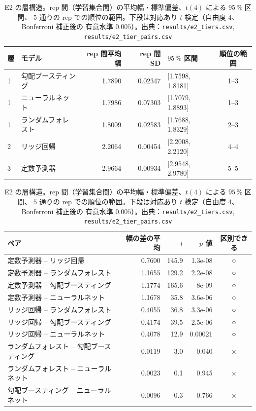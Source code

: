 \documentclass[a4paper,11pt]{jsarticle}
\theoremstyle{definition}
\theoremstyle{plain}
\theoremstyle{remark}
\begin{document}
\begin{table}[htbp]
  \centering
  \caption{E2 の層構造。rep 間（学習集合間）の平均幅・標準偏差、$t(4)$ による $95\,\%$ 区間、
    $5$ 通りの rep での順位の範囲。下段は対応あり $t$ 検定（自由度 $4$、Bonferroni 補正後の
    有意水準 $0.005$）。出典：\texttt{results/e2\_tiers.csv}, \texttt{results/e2\_tier\_pairs.csv}}
  \label{tab:e2-tiers}
  \small
  \begin{tabular}{llrrlc}
    \toprule
    層 & モデル & rep 間平均幅 & rep 間 SD & $95\,\%$ 区間 & 順位の範囲 \\
    \midrule
    1 & 勾配ブースティング & 1.7890 & 0.02347 & [1.7598, 1.8181] & 1--3 \\
    1 & ニューラルネット & 1.7986 & 0.07303 & [1.7079, 1.8893] & 1--3 \\
    1 & ランダムフォレスト & 1.8009 & 0.02583 & [1.7688, 1.8329] & 2--3 \\
    2 & リッジ回帰 & 2.2064 & 0.00454 & [2.2008, 2.2120] & 4--4 \\
    3 & 定数予測器 & 2.9664 & 0.00934 & [2.9548, 2.9780] & 5--5 \\
    \bottomrule
  \end{tabular}

  \medskip
  \begin{tabular}{lrrrc}
    \toprule
    ペア & 幅の差の平均 & $t$ & $p$ 値 & 区別できる \\
    \midrule
    定数予測器 -- リッジ回帰 & 0.7600 & 145.9 & 1.3e-08 & ○ \\
    定数予測器 -- ランダムフォレスト & 1.1655 & 129.2 & 2.2e-08 & ○ \\
    定数予測器 -- 勾配ブースティング & 1.1774 & 165.6 & 8e-09 & ○ \\
    定数予測器 -- ニューラルネット & 1.1678 & 35.8 & 3.6e-06 & ○ \\
    リッジ回帰 -- ランダムフォレスト & 0.4055 & 36.8 & 3.3e-06 & ○ \\
    リッジ回帰 -- 勾配ブースティング & 0.4174 & 39.5 & 2.5e-06 & ○ \\
    リッジ回帰 -- ニューラルネット & 0.4078 & 12.9 & 0.00021 & ○ \\
    ランダムフォレスト -- 勾配ブースティング & 0.0119 & 3.0 & 0.040 & × \\
    ランダムフォレスト -- ニューラルネット & 0.0023 & 0.1 & 0.945 & × \\
    勾配ブースティング -- ニューラルネット & -0.0096 & -0.3 & 0.766 & × \\
    \bottomrule
  \end{tabular}
\end{table}
\end{document}
